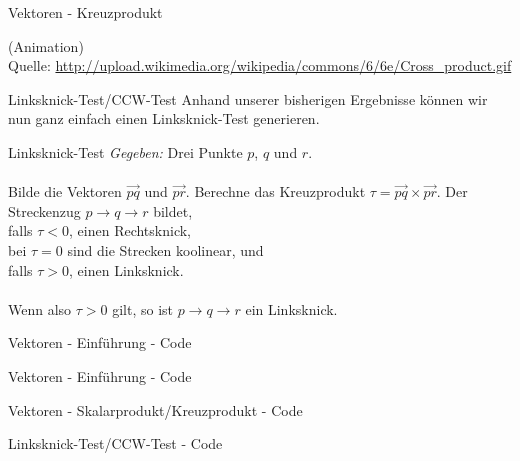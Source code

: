 \begin{frame}{Vektoren - Kreuzprodukt}
	\begin{center}
		(Animation)\\
		Quelle:	\url{http://upload.wikimedia.org/wikipedia/commons/6/6e/Cross_product.gif}
	\end{center}
\end{frame}

\begin{frame}{Linksknick-Test/CCW-Test}
	Anhand unserer bisherigen Ergebnisse können wir nun ganz einfach einen Linksknick-Test generieren.
	
	\begin{block}{Linksknick-Test}
		\textit{Gegeben:} Drei Punkte $p$, $q$ und $r$.\\ \ \\
		
		Bilde die Vektoren $\overrightarrow{pq}$ und $\overrightarrow{pr}$. Berechne das Kreuzprodukt $\tau = \overrightarrow{pq} \times \overrightarrow{pr}$. Der Streckenzug $p \rightarrow q \rightarrow r$ bildet,\\
		falls $\tau < 0$, einen Rechtsknick,\\
		bei $\tau = 0$ sind die Strecken koolinear, und\\
		falls $\tau > 0$, einen Linksknick.\\ \ \\
		
		Wenn also $\tau > 0$ gilt, so ist $p \rightarrow q \rightarrow r$ ein Linksknick.
	\end{block}
\end{frame}

\begin{frame}{Vektoren - Einführung - Code}
	\lstset{
		language=C++,
		tabsize=1
	}
	
\end{frame}

\begin{frame}{Vektoren - Einführung - Code}
	\lstset{
		language=C++,
		tabsize=1
	}
	
\end{frame}

\begin{frame}{Vektoren - Skalarprodukt/Kreuzprodukt - Code}
	\lstset{
		language=C++,
		tabsize=1
	}
	
\end{frame}

\begin{frame}{Linksknick-Test/CCW-Test - Code}
	\lstset{
		language=C++,
		tabsize=1
	}
	
\end{frame}

